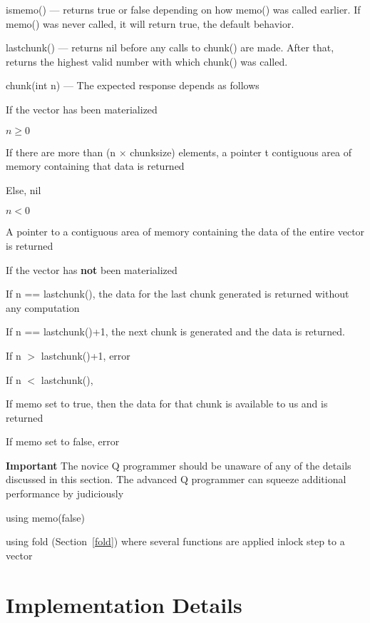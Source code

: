 \item ismemo() --- returns true or false depending on how memo() was called
earlier. If memo() was never called, it will return true, the default behavior.

\item lastchunk() --- returns nil before any calls to chunk() are made. After
that, returns the highest valid number with which chunk() was called.
\item chunk(int n) --- The expected response depends as follows
\be
\item If the vector has been materialized
\be
\item \(n \geq 0\) 
\be
\item If there are more than (n \(\times\) chunksize) elements, a pointer t
contiguous area of memory containing that data is returned
\item Else, nil
\ee
\item \(n < 0\)

A pointer to a contiguous area of memory containing the data of the
entire vector is returned
\ee
\item If the vector has {\bf not} been materialized
\be
\item If n == lastchunk(), the data for the last chunk generated is returned
without any computation
\item If n == lastchunk()+1, the next chunk is generated and the data is
returned.
\item If n \(>\) lastchunk()+1, error 
\item If n \(<\) lastchunk(), 

\be
\item If memo set to true, then the data for that chunk is available to us and
is returned
\item If memo set to false, error
\ee
\ee
\ee
\ee

{\bf Important}
The novice Q programmer should be unaware of any of the details discussed in
this section.
The advanced Q programmer can squeeze additional performance by judiciously 
\be
\item using memo(false)
\item using fold (Section~\ref{fold}) where several functions are applied inlock
step to a vector
\ee

\section{Implementation Details}
\label{vector_implementation}

